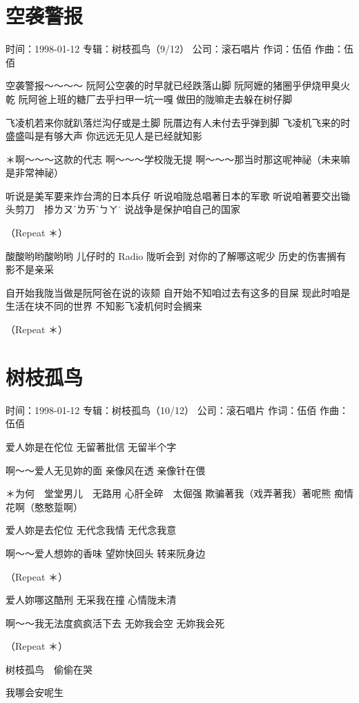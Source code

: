 \documentclass[UTF8,a4paper,oneside,twocolumn,12pt]{ctexbook}
\newcommand{\infopair}[2]{\textbullet #1：#2}
\newcommand{\zc}[1][伍佰]{\infopair{作词}{#1}}
\newcommand{\zq}[1][伍佰]{\infopair{作曲}{#1}}
\newcommand{\zj}[1]{\infopair{专辑}{#1}}
\newcommand{\sj}[1]{\infopair{时间}{#1}}
\newcommand{\gs}[1]{\infopair{公司}{#1}}
\newenvironment{info}{\begin{flushleft}\kaishu
	}
	{\end{flushleft}\normalsize\yahei\par}
\newenvironment{lyric}{
	}
{}
\begin{document}
\section{空袭警报}
\begin{info}
	\sj{1998-01-12}
	\zj{树枝孤鸟（9/12）}
	\gs{滚石唱片}
	\zc
	\zq
\end{info}
\begin{lyric}
	空袭警报～～～～
	阮阿公空袭的时早就已经跌落山脚
	阮阿嬷的猪圈乎伊烧甲臭火乾
	阮阿爸上班的糖厂去乎扫甲一坑一嘎
	做田的陇嘛走去躲在树仔脚

	飞凌机若来你就趴落烂沟仔或是土脚
	阮厝边有人未付去乎弹到脚
	飞凌机飞来的时盛盛叫是有够大声
	你远远无见人是已经就知影

	＊啊～～～这款的代志
	啊～～～学校陇无提
	啊～～～那当时那这呢神祕（未来嘛是非常神祕）

	听说是美军要来炸台湾的日本兵仔
	听说咱陇总唱著日本的军歌
	听说咱著要交出锄头剪刀　掺ㄌㄡˊㄌㄞˋㄅㄚ˙
	说战争是保护咱自己的国家

	（Repeat ＊）

	酸酸哟哟酸哟哟
	儿仔时的 Radio 陇听会到
	对你的了解哪这呢少
	历史的伤害搁有影不是亲采

	自开始我陇当做是阮阿爸在说的诙颏
	自开始不知咱过去有这多的目屎
	现此时咱是生活在块不同的世界
	不知影飞凌机何时会搁来

	（Repeat ＊）
\end{lyric}

\section{树枝孤鸟}
\begin{info}
	\sj{1998-01-12}
	\zj{树枝孤鸟（10/12）}
	\gs{滚石唱片}
	\zc
	\zq
\end{info}
\begin{lyric}
	爱人妳是在佗位
	无留著批信
	无留半个字

	啊～～爱人无见妳的面
	亲像风在透
	亲像针在偎

	＊为何　堂堂男儿　无路用
	心肝全碎　太倔强
	欺骗著我（戏弄著我）著呢熊
	痴情花啊（憨憨踅啊）

	爱人妳是去佗位
	无代念我情
	无代念我意

	啊～～爱人想妳的香味
	望妳快回头
	转来阮身边

	（Repeat ＊）

	爱人妳哪这酷刑
	无采我在撞
	心情陇未清

	啊～～我无法度疯疯活下去
	无妳我会空
	无妳我会死

	（Repeat ＊）

	树枝孤鸟　偷偷在哭

	我哪会安呢生
\end{lyric}
\end{document}

